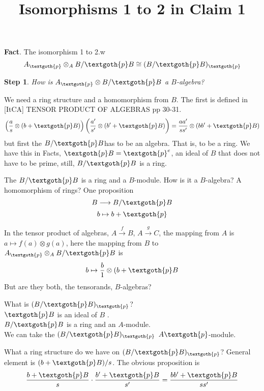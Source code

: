 \documentclass{article}
\title{Isomorphisms 1 to 2 in Claim 1}
\newtheorem{theorem}{Step}
\begin{document}
\maketitle

\textbf{Fact}. The isomorphism 1 to 2.w
\[
  A_\textgoth{p} \otimes_A B/\textgoth{p}B \cong (B/\textgoth{p}B)_\textgoth{p}
\]

\begin{theorem}
How is $A_\textgoth{p} \otimes B/\textgoth{p}B$ a $B$-algebra?
\end{theorem}


We need a ring structure and a homomorphism from $B$. The first is defined in [ItCA] TENSOR PRODUCT OF ALGEBRAS pp 30-31.
\[
    \left( \frac{a}{s} \otimes (b + \textgoth{p}B) \right) \left( \frac{a'}{s'} \otimes (b' + \textgoth{p}B) \right) = \frac{aa'}{ss'} \otimes (bb' + \textgoth{p}B)
\]
but first the $B/\textgoth{p}B$has to be an algebra. That is, to be a ring. We have this in Facts, $\textgoth{p}B = \textgoth{p}^e$, an ideal of $B$ that does not have to be prime, still, $B/\textgoth{p}B$ is a ring.

The $B/\textgoth{p}B$ is a ring and a $B$-module. How is it a $B$-algebra? A homomorphism of rings? One proposition
\[
B \longrightarrow B/\textgoth{p}B
\]
\[
b \mapsto b + \textgoth{p}
\]

In the tensor product of algebras, $A \xrightarrow{f} B$, $A \xrightarrow{g} C$, the mapping from $A$ is $a \mapsto f(a) \otimes g(a)$, here the mapping from $B$ to $A_\textgoth{p} \otimes_A B/\textgoth{p}B$ is
\[
 b \mapsto \frac{b}{1} \otimes (b + \textgoth{p}B
\]
But are they both, the tensorands, $B$-algebras?

\vspace{10px}

What is $(B/\textgoth{p}B)_\textgoth{p}$? \\
$\textgoth{p}B$ is an ideal of $B$ . \\
$B/\textgoth{p}B$ is a ring and an $A$-module. \\
We can take the $(B/\textgoth{p}B)_\textgoth{p}$ $A\textgoth{p}$-module.

What a ring structure do we have on $(B/\textgoth{p}B)_\textgoth{p}$? General element is $(b + \textgoth{p}B)/s$. The obvious proposition is
\[
  \frac{b + \textgoth{p}B}{s} \cdot \frac{b' + \textgoth{p}B}{s'} = \frac{bb' + \textgoth{p}B}{ss'}
\]
\end{document}
